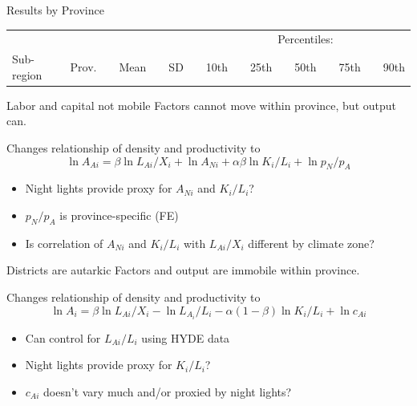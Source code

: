 \documentclass[10pt, xcolor=dvipsnames]{beamer}
\begin{document}
\begin{frame}{Results by Province}

{\tiny
\begin{tabularx}{\textwidth}{lrXrXrXrXrXrXrXr}
\midrule
           &       &&      &&     && \multicolumn{9}{c}{Percentiles:} \\ \cmidrule{8-16}
Sub-region & Prov. && Mean && SD  && 10th    && 25th    && 50th && 75th && 90th \\
\midrule

\midrule
\end{tabularx}
}

\hfill \hyperlink{robustness}{}
\end{frame}


\begin{frame}{Labor and capital not mobile}\label{nonmobile}
Factors cannot move within province, but output can.

\vspace{.2cm} Changes relationship of density and productivity to
\begin{equation}
  \ln A_{Ai} = \beta \ln L_{Ai}/X_i + \ln A_{Ni} + \alpha\beta \ln K_i/L_i + \ln p_N/p_A \nonumber
\end{equation}
\begin{itemize}
  \item Night lights provide proxy for $A_{Ni}$ and $K_i/L_i$?
  \item $p_N/p_A$ is province-specific (FE)
  \item Is correlation of $A_{Ni}$ and $K_i/L_i$ with $L_{Ai}/X_i$ different by climate zone?
\end{itemize}

\hfill \hyperlink{robustness}{}
\end{frame}

\begin{frame}{Districts are autarkic}\label{autarky}
Factors and output are immobile within province.

\vspace{.2cm} Changes relationship of density and productivity to
\begin{equation}
\ln A_i = \beta \ln L_{Ai}/X_i - \ln L_{A_i}/L_i - \alpha(1-\beta) \ln K_{i}/L_{i} + \ln c_{Ai} \nonumber
\end{equation}
\begin{itemize}
  \item Can control for $L_{Ai}/L_i$ using HYDE data
  \item Night lights provide proxy for $K_i/L_i$?
  \item $c_{Ai}$ doesn't vary much and/or proxied by night lights?
\end{itemize}

\end{frame}
\end{document}
